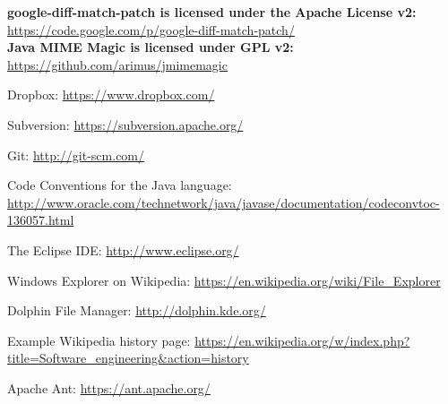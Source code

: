 \documentclass[12pt,a4paper]{article}
\begin{document}
\textbf{google-diff-match-patch is licensed under the Apache License v2:} \\
\url{https://code.google.com/p/google-diff-match-patch/} \\

\textbf{Java MIME Magic is licensed under GPL v2:} \\
\url{https://github.com/arimus/jmimemagic}

\begin{thebibliography}{9}

  Dropbox: \url{https://www.dropbox.com/}
  
  Subversion: \url{https://subversion.apache.org/}

  Git: \url{http://git-scm.com/}

  Code Conventions for the Java language: \url{http://www.oracle.com/technetwork/java/javase/documentation/codeconvtoc-136057.html}
  
  The Eclipse IDE: \url{http://www.eclipse.org/}

  Windows Explorer on Wikipedia: \url{https://en.wikipedia.org/wiki/File_Explorer}

  Dolphin File Manager: \url{http://dolphin.kde.org/}
  
  Example Wikipedia history page: \url{https://en.wikipedia.org/w/index.php?title=Software_engineering&action=history}
  
  Apache Ant: \url{https://ant.apache.org/}

\end{thebibliography}
\end{document}
